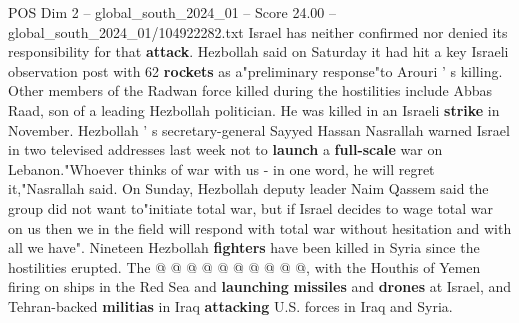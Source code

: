 \begin{textsample}{POS Dim 2 – global\_south\_2024\_01 – Score 24.00 – global\_south\_2024\_01/104922282.txt}
Israel has neither confirmed nor denied its responsibility for that \textbf{attack}.
Hezbollah said on Saturday it had hit a key Israeli observation post with 62 \textbf{rockets} as a"preliminary response"to Arouri ' s killing.
Other members of the Radwan force killed during the hostilities include Abbas Raad, son of a leading Hezbollah politician.
He was killed in an Israeli \textbf{strike} in November.
Hezbollah ' s secretary-general Sayyed Hassan Nasrallah warned Israel in two televised addresses last week not to \textbf{launch} a \textbf{full-scale} war on Lebanon."Whoever thinks of war with us - in one word, he will regret it,"Nasrallah said.
On Sunday, Hezbollah deputy leader Naim Qassem said the group did not want to"initiate total war, but if Israel decides to wage total war on us then we in the field will respond with total war without hesitation and with all we have".
Nineteen Hezbollah \textbf{fighters} have been killed in Syria since the hostilities erupted.
The @ @ @ @ @ @ @ @ @ @, with the Houthis of Yemen firing on ships in the Red Sea and \textbf{launching} \textbf{missiles} and \textbf{drones} at Israel, and Tehran-backed \textbf{militias} in Iraq \textbf{attacking} U.S. forces in Iraq and Syria.

\end{textsample}

